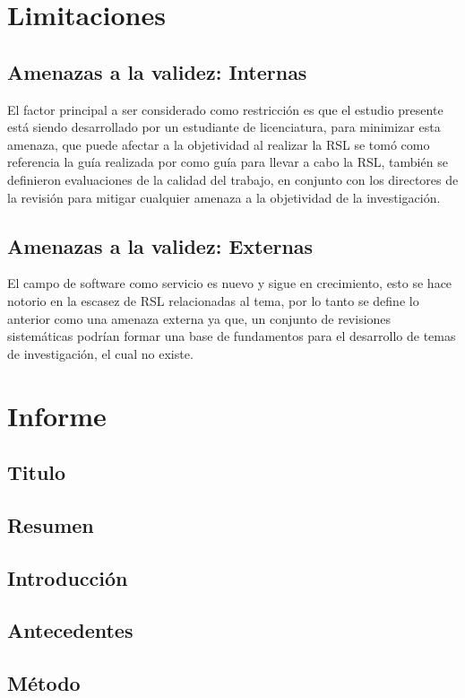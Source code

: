 \documentclass{article}
\begin{document}
\section{Limitaciones}
\subsection{Amenazas a la validez: Internas}
El factor principal a ser considerado como restricción es que el estudio presente está siendo 
desarrollado por un estudiante de licenciatura, para minimizar esta amenaza, que puede afectar a la objetividad 
al realizar la RSL se tomó como referencia la guía realizada por \cite{kitchenham2007guidelines}
como guía para llevar a cabo la RSL, también se definieron evaluaciones de la calidad del trabajo, en conjunto 
con los directores de la revisión para mitigar cualquier amenaza a la objetividad de la investigación. 

\subsection{Amenazas a la validez: Externas}
El campo de software como servicio es nuevo y sigue en crecimiento, esto se hace notorio en la escasez de 
RSL relacionadas al tema, por lo tanto se define lo anterior como  una amenaza externa ya que, un conjunto 
de revisiones sistemáticas podrían formar una base de fundamentos para el desarrollo de temas de investigación, el cual no existe.
\newpage


\section{Informe}
\subsection{Titulo}
\subsection{Resumen}
\subsection{Introducción}
\subsection{Antecedentes}
\subsection{Método}
\end{document}
